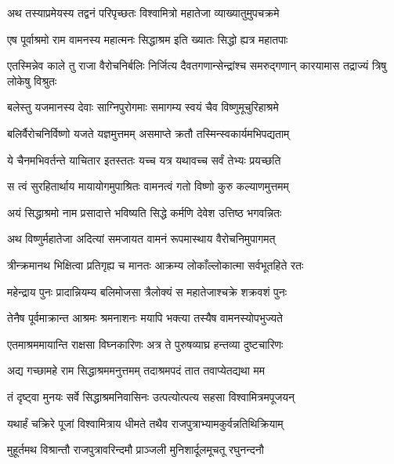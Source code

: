 
\twolineshloka
{अथ तस्याप्रमेयस्य तद्वनं परिपृच्छतः}
{विश्वामित्रो महातेजा व्याख्यातुमुपचक्रमे} %

\twolineshloka
{एष पूर्वाश्रमो राम वामनस्य महात्मनः}
{सिद्धाश्रम इति ख्यातः सिद्धो ह्यत्र महातपाः} %

\threelineshloka
{एतस्मिन्नेव काले तु राजा वैरोचनिर्बलिः}
{निर्जित्य दैवतगणान्सेन्द्रांश्च समरुद्गणान्}
{कारयामास तद्राज्यं त्रिषु लोकेषु विश्रुतः} %

\twolineshloka
{बलेस्तु यजमानस्य देवाः साग्निपुरोगमाः}
{समागम्य स्वयं चैव विष्णुमूचुरिहाश्रमे} %

\twolineshloka
{बलिर्वैरोचनिर्विष्णो यजते यज्ञमुत्तमम्}
{असमाप्ते क्रतौ तस्मिन्स्वकार्यमभिपद्यताम्} %

\twolineshloka
{ये चैनमभिवर्तन्ते याचितार इतस्ततः}
{यच्च यत्र यथावच्च सर्वं तेभ्यः प्रयच्छति} %

\twolineshloka
{स त्वं सुरहितार्थाय मायायोगमुपाश्रितः}
{वामनत्वं गतो विष्णो कुरु कल्याणमुत्तमम्} %

\twolineshloka
{अयं सिद्धाश्रमो नाम प्रसादात्ते भविष्यति}
{सिद्धे कर्मणि देवेश उत्तिष्ठ भगवन्नितः} %

\twolineshloka
{अथ विष्णुर्महातेजा अदित्यां समजायत}
{वामनं रूपमास्थाय वैरोचनिमुपागमत्} %

\twolineshloka
{त्रीन्क्रमानथ भिक्षित्वा प्रतिगृह्य च मानतः}
{आक्रम्य लोकाँल्लोकात्मा सर्वभूतहिते रतः} %

\twolineshloka
{महेन्द्राय पुनः प्रादान्नियम्य बलिमोजसा}
{त्रैलोक्यं स महातेजाश्चक्रे शक्रवशं पुनः} %

\twolineshloka
{तेनैष पूर्वमाक्रान्त आश्रमः श्रमनाशनः}
{मयापि भक्त्या तस्यैष वामनस्योपभुज्यते} %

\twolineshloka
{एतमाश्रममायान्ति राक्षसा विघ्नकारिणः}
{अत्र ते पुरुषव्याघ्र हन्तव्या दुष्टचारिणः} %

\twolineshloka
{अद्य गच्छामहे राम सिद्धाश्रममनुत्तमम्}
{तदाश्रमपदं तात तवाप्येतद्यथा मम} %

\twolineshloka
{तं दृष्ट्वा मुनयः सर्वे सिद्धाश्रमनिवासिनः}
{उत्पत्योत्पत्य सहसा विश्वामित्रमपूजयन्} %

\twolineshloka
{यथार्हं चक्रिरे पूजां विश्वामित्राय धीमते}
{तथैव राजपुत्राभ्यामकुर्वन्नतिथिक्रियाम्} %

\twolineshloka
{मुहूर्तमथ विश्रान्तौ राजपुत्रावरिन्दमौ}
{प्राञ्जली मुनिशार्दूलमूचतू रघुनन्दनौ} %

